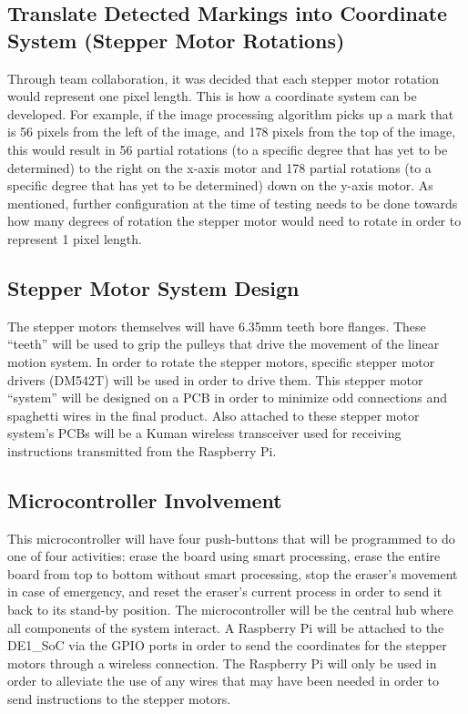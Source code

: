 \subsection{Translate Detected Markings into Coordinate System (Stepper Motor Rotations)}
Through team collaboration, it was decided that each stepper motor rotation would represent one pixel length. This is how a coordinate system can be developed. For example, if the image processing algorithm picks up a mark that is 56 pixels from the left of the image, and 178 pixels from the top of the image, this would result in 56 partial rotations (to a specific degree that has yet to be determined) to the right on the x-axis motor and 178 partial rotations (to a specific degree that has yet to be determined) down on the y-axis motor. As mentioned, further configuration at the time of testing needs to be done towards how many degrees of rotation the stepper motor would need to rotate in order to represent 1 pixel length.

\subsection{Stepper Motor System Design}
The stepper motors themselves will have 6.35mm teeth bore flanges. These ``teeth'' will be used to grip the pulleys that drive the movement of the linear motion system. In order to rotate the stepper motors, specific stepper motor drivers (DM542T) will be used in order to drive them. This stepper motor ``system'' will be designed on a PCB in order to minimize odd connections and spaghetti wires in the final product. Also attached to these stepper motor system's PCBs will be a Kuman wireless transceiver used for receiving instructions transmitted from the Raspberry Pi.
\subsection{Microcontroller Involvement}
This microcontroller will have four push-buttons that will be programmed to do one of four activities: erase the board using smart processing, erase the entire board from top to bottom without smart processing, stop the eraser's movement in case of emergency, and reset the eraser's current process in order to send it back to its stand-by position. The microcontroller will be the central  hub where all components of the system interact. A Raspberry Pi will be attached to the DE1\_SoC via the GPIO ports in order to send the coordinates for the stepper motors through a wireless connection. The Raspberry Pi will only be used in order to alleviate the use of any wires that may have been needed in order to send instructions to the stepper motors.
